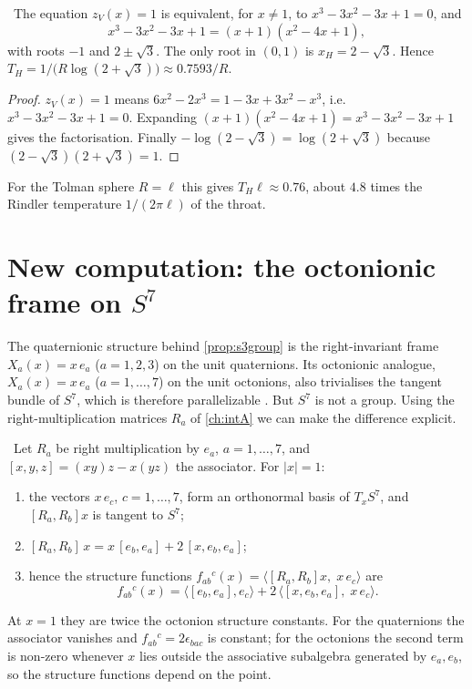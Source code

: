 \begin{proposition}\txt\
The equation $z_V(x)=1$ is equivalent, for $x\ne1$, to $x^3-3x^2-3x+1=0$, and
\[
x^3-3x^2-3x+1=(x+1)(x^2-4x+1),
\]
with roots $-1$ and $2\pm\sqrt3$. The only root in $(0,1)$ is $x_H=2-\sqrt3$. Hence $T_H=1/\bigl(R\log(2+\sqrt3)\bigr)\approx0.7593/R$.
\end{proposition}

\begin{proof}
$z_V(x)=1$ means $6x^2-2x^3=1-3x+3x^2-x^3$, i.e.\ $x^3-3x^2-3x+1=0$. Expanding $(x+1)(x^2-4x+1)=x^3-3x^2-3x+1$ gives the factorisation. Finally $-\log(2-\sqrt3)=\log(2+\sqrt3)$ because $(2-\sqrt3)(2+\sqrt3)=1$.
\end{proof}

For the Tolman sphere $R=\ell$ this gives $T_H\ell\approx0.76$, about $4.8$ times the Rindler temperature $1/(2\pi\ell)$ of the throat.

\section{New computation: the octonionic frame on \texorpdfstring{$S^7$}{S7}}

The quaternionic structure behind \cref{prop:s3group} is the right-invariant frame $X_a(x)=x\,e_a$ ($a=1,2,3$) on the unit quaternions. Its octonionic analogue, $X_a(x)=x\,e_a$ ($a=1,\dots,7$) on the unit octonions, also trivialises the tangent bundle of $S^7$, which is therefore parallelizable \cite{Englert1982}. But $S^7$ is not a group. Using the right-multiplication matrices $R_a$ of \cref{ch:intA} we can make the difference explicit.

\begin{theorem}[Structure functions on $S^7$]\label{thm:s7soft}\txt\
Let $R_a$ be right multiplication by $e_a$, $a=1,\dots,7$, and $[x,y,z]=(xy)z-x(yz)$ the associator. For $|x|=1$:
\begin{enumerate}[label=(\roman*)]
\item the vectors $x\,e_c$, $c=1,\dots,7$, form an orthonormal basis of $T_xS^7$, and $[R_a,R_b]x$ is tangent to $S^7$;
\item $[R_a,R_b]\,x=x\,[e_b,e_a]+2\,[x,e_b,e_a]$;
\item hence the structure functions $f_{ab}{}^c(x)=\langle[R_a,R_b]x,\;x\,e_c\rangle$ are
\[
f_{ab}{}^c(x)=\langle[e_b,e_a],e_c\rangle+2\,\langle[x,e_b,e_a],\;x\,e_c\rangle .
\]
\end{enumerate}
At $x=1$ they are twice the octonion structure constants. For the quaternions the associator vanishes and $f_{ab}{}^c=2\epsilon_{bac}$ is constant; for the octonions the second term is non-zero whenever $x$ lies outside the associative subalgebra generated by $e_a,e_b$, so the structure functions depend on the point.
\end{theorem}

